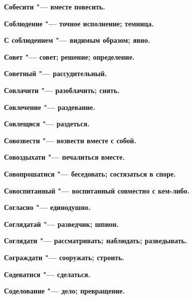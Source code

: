 \begin{mymulticols}{2}
\bfseries Собесити\normalfont{} "--- вместе повесить. 




\bfseries Соблюдение\normalfont{} "--- точное исполнение; темница. 




\bfseries С соблюдением\normalfont{} "--- видимым образом; явно. 




\bfseries Совет\normalfont{} "--- совет; решение; определение. 




\bfseries Советный\normalfont{} "--- рассудительный. 




\bfseries Совлачити\normalfont{} "--- разоблачить; снять. 




\bfseries Совлечение\normalfont{} "--- раздевание. 




\bfseries Совлещися\normalfont{} "--- раздеться. 




\bfseries Совозвести\normalfont{} "--- возвести вместе с собой. 




\bfseries Совоздыхати\normalfont{} "--- печалиться вместе. 




\bfseries Совопрошатися\normalfont{} "--- беседовать; состязаться в споре. 




\bfseries Совоспитанный\normalfont{} "--- воспитанный совместно с кем-либо. 




\bfseries Согласно\normalfont{} "--- единодушно. 




\bfseries Соглядатай\normalfont{} "--- разведчик; шпион. 




\bfseries Соглядати\normalfont{} "--- рассматривать; наблюдать; разведывать. 




\bfseries Сограждати\normalfont{} "--- сооружать; строить. 




\bfseries Содеватися\normalfont{} "--- сделаться. 




\bfseries Соделование\normalfont{} "--- дело; превращение. 





\end{mymulticols}
